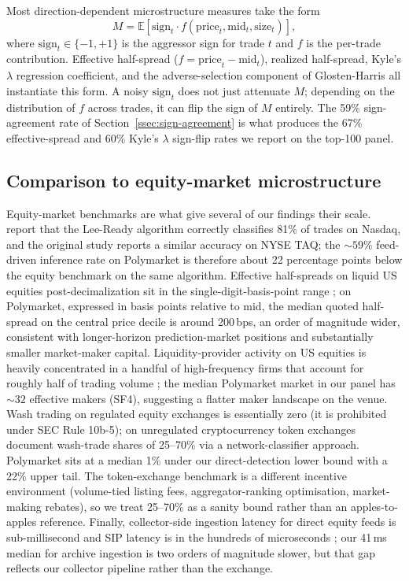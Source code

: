 Most direction-dependent microstructure measures take the form
\begin{equation*}
  M = \mathbb{E}\!\left[
    \mathrm{sign}_t \cdot
    f(\mathrm{price}_t, \mathrm{mid}_t, \mathrm{size}_t)
  \right],
\end{equation*}
where $\mathrm{sign}_t \in \{-1, +1\}$ is the aggressor sign for
trade $t$ and $f$ is the per-trade contribution. Effective half-spread
($f = \mathrm{price}_t - \mathrm{mid}_t$), realized half-spread,
Kyle's $\lambda$ regression coefficient, and the adverse-selection
component of Glosten-Harris all instantiate this form. A noisy $\mathrm{sign}_t$ does not just attenuate $M$; depending on
the distribution of $f$ across trades, it can flip the sign of $M$
entirely. The 59\% sign-agreement rate of
Section~\ref{ssec:sign-agreement} is what produces the 67\%
effective-spread and 60\% Kyle's $\lambda$ sign-flip rates we report
on the top-100 panel.

\subsection{Comparison to equity-market microstructure}\label{ssec:equity-comparison}

Equity-market benchmarks are what give several of our findings their
scale. \citet{ellis-michaely-ohara-2000} report that the Lee-Ready
algorithm correctly classifies 81\% of trades on Nasdaq, and the
original \citet{lee-ready-1991} study reports a similar accuracy on
NYSE TAQ; the $\sim 59\%$ feed-driven inference rate on Polymarket
is therefore about 22 percentage points below the equity benchmark
on the same algorithm.
Effective half-spreads on liquid US equities post-decimalization sit
in the single-digit-basis-point range
\citep{hasbrouck-2007,foucault-pagano-roell-2013}; on Polymarket,
expressed in basis points relative to mid, the median quoted
half-spread on the central price decile is around 200\,bps, an order
of magnitude wider, consistent with longer-horizon prediction-market
positions and substantially smaller market-maker capital.
Liquidity-provider activity on US equities is heavily concentrated
in a handful of high-frequency firms that account for roughly half
of trading volume \citep{brogaard-hendershott-riordan-2014}; the
median Polymarket market in our panel has $\sim 32$ effective makers
(SF4), suggesting a flatter maker landscape on the venue. Wash
trading on regulated equity exchanges is essentially zero (it is
prohibited under SEC Rule 10b-5); on unregulated cryptocurrency
token exchanges \citet{cong-li-tang-yang-2023} document wash-trade shares
of 25--70\% via a network-classifier approach. Polymarket sits at a
median 1\% under our direct-detection lower bound with a 22\% upper
tail. The token-exchange benchmark is a different incentive
environment (volume-tied listing fees, aggregator-ranking
optimisation, market-making rebates), so we treat 25--70\% as a
sanity bound rather than an apples-to-apples reference. Finally,
collector-side ingestion latency for direct equity feeds is
sub-millisecond and SIP latency is in the hundreds of microseconds
\citep{hasbrouck-2007}; our 41\,ms median for archive ingestion is
two orders of magnitude slower, but that gap reflects our
collector pipeline rather than the exchange.
